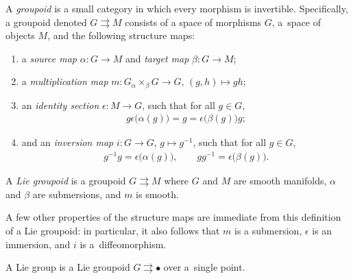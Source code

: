 \documentclass[pdftex]{sigma}
\numberwithin{equation}{section}
\begin{document}
\begin{Definition} \label{def:groupoid} A \emph{groupoid} is a small category in which every morphism is invertible. Specif\/ically, a groupoid denoted
 $ G \rightrightarrows M $ consists of a space of morphisms $G$, a~space of objects $M$, and the following structure maps:
\begin{enumerate}[label=(\roman*)]\itemsep=0pt
\item a \emph{source map} $ \alpha \colon G \rightarrow M $ and \emph{target map} $ \beta \colon G \rightarrow M $;
\item a \emph{multiplication map} $ m \colon G \mathbin{_\alpha \times _\beta } G \rightarrow G $, $ ( g, h ) \mapsto g h $;
\item an \emph{identity section} $ \epsilon \colon M \rightarrow G $, such that for all $ g \in G $,
 \begin{gather*}
 g \epsilon ( \alpha (g) \bigr) = g = \epsilon \bigl( \beta (g)\bigr) g ;
 \end{gather*}
\item and an \emph{inversion map} $ i \colon G \rightarrow G $, $ g \mapsto g ^{-1} $, such that for all $ g \in G $,
 \begin{gather*}
 g ^{-1} g = \epsilon \bigl( \alpha (g) \bigr) , \qquad g g ^{-1} = \epsilon \bigl( \beta (g) \bigr) .
 \end{gather*}
\end{enumerate}
A \emph{Lie groupoid} is a groupoid $ G \rightrightarrows M $ where $G$ and $M$ are smooth manifolds, $\alpha$ and $\beta$ are submersions, and $m$ is smooth.
\end{Definition}

\begin{Remark} A few other properties of the structure maps are immediate from this def\/inition of a Lie groupoid: in particular, it also follows that
 $m$ is a submersion, $\epsilon$ is an immersion, and $i$ is a~dif\/feomorphism.
\end{Remark}

\begin{Example} \label{ex:lieGroup} A Lie group is a Lie groupoid $ G \rightrightarrows \bullet $ over a~single point.
\end{Example}
\end{document}
